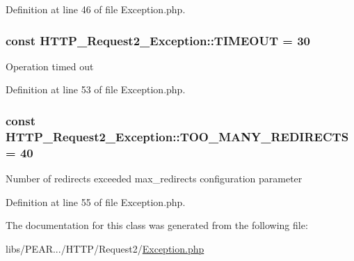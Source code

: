 Definition at line 46 of file Exception.\+php.

\subsubsection[{\texorpdfstring{T\+I\+M\+E\+O\+UT}{TIMEOUT}}]{\setlength{\rightskip}{0pt plus 5cm}const H\+T\+T\+P\+\_\+\+Request2\+\_\+\+Exception\+::\+T\+I\+M\+E\+O\+UT = 30}\hypertarget{classHTTP__Request2__Exception_a9eff2e63fc4d2ac0e2692610c7709ac9}{}\label{classHTTP__Request2__Exception_a9eff2e63fc4d2ac0e2692610c7709ac9}
Operation timed out 

Definition at line 53 of file Exception.\+php.

\subsubsection[{\texorpdfstring{T\+O\+O\+\_\+\+M\+A\+N\+Y\+\_\+\+R\+E\+D\+I\+R\+E\+C\+TS}{TOO_MANY_REDIRECTS}}]{\setlength{\rightskip}{0pt plus 5cm}const H\+T\+T\+P\+\_\+\+Request2\+\_\+\+Exception\+::\+T\+O\+O\+\_\+\+M\+A\+N\+Y\+\_\+\+R\+E\+D\+I\+R\+E\+C\+TS = 40}\hypertarget{classHTTP__Request2__Exception_accfb520aa06566f09fe26138beb3da62}{}\label{classHTTP__Request2__Exception_accfb520aa06566f09fe26138beb3da62}
Number of redirects exceeded \textquotesingle{}max\+\_\+redirects\textquotesingle{} configuration parameter 

Definition at line 55 of file Exception.\+php.



The documentation for this class was generated from the following file\+:\begin{DoxyCompactItemize}
\item 
libs/\+P\+E\+A\+R.../\+H\+T\+T\+P/\+Request2/\hyperlink{HTTP_2Request2_2Exception_8php}{Exception.\+php}\end{DoxyCompactItemize}
